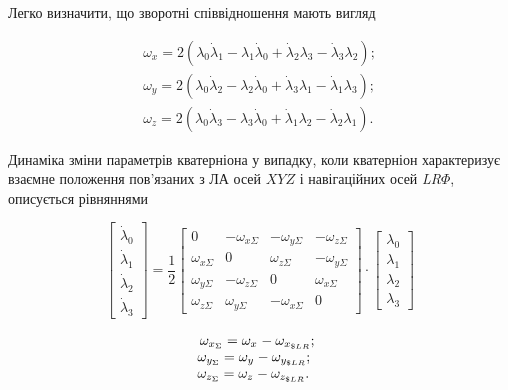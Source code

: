 Легко визначити, що зворотні співвідношення мають вигляд

\[\begin{array}{l} {\omega_{x} =2\left(\lambda_{0} \dot{\lambda }_{1} -\lambda 
_{1} \dot{\lambda }_{0} +\dot{\lambda }_{2} \lambda_{3} -\dot{\lambda }_{3} \lambda 
_{2} \right);} \\ {\omega_{y} =2\left(\lambda_{0} \dot{\lambda }_{2} -\lambda_{2} 
\dot{\lambda }_{0} +\dot{\lambda }_{3} \lambda_{1} -\dot{\lambda }_{1} \lambda_{3} 
\right);} \\ {\omega_{z} =2\left(\lambda_{0} \dot{\lambda }_{3} -\lambda_{3} \dot{
\lambda }_{0} +\dot{\lambda }_{1} \lambda_{2} -\dot{\lambda }_{2} \lambda_{1} \right).} 
\end{array}\] 

Динаміка зміни параметрів кватерніона у випадку, коли кватерніон характеризує взаємне 
положення пов'язаних з ЛА осей $XYZ$ і навігаційних осей \textit{LR$\Phi $}, описується 
рівняннями

\[\left[\begin{array}{c} {\dot{\lambda }_{0} } \\ {\dot{\lambda }_{1} } \\ {\dot{
\lambda }_{2} } \\ {\dot{\lambda }_{3} } \end{array}\right]=\frac{1}{2} \left[\begin{array}{cccc} 
{0} & {-\omega_{x\Sigma } } & {-\omega_{y\Sigma } } & {-\omega_{z\Sigma } } \\ 
{\omega_{x\Sigma } } & {0} & {\omega_{z\Sigma } } & {-\omega_{y\Sigma } } \\ {
\omega_{y\Sigma } } & {-\omega_{z\Sigma } } & {0} & {\omega_{x\Sigma } } \\ {
\omega_{z\Sigma } } & {\omega_{y\Sigma } } & {-\omega_{x\Sigma } } & {0} \end{array}
\right]\cdot \left[\begin{array}{c} {\lambda_{0} } \\ {\lambda_{1} } \\ {\lambda 
_{2} } \\ {\lambda_{3} } \end{array}\right]\] 


\[\begin{array}{l} {\, \omega_{x_{\Sigma } } =\omega_{x_{{\rm }} } -\omega_{x_{
\$ LR} } ;\, \, \, } \\ {\omega_{y_{\Sigma } } =\omega_{y_{{\rm }} } -\omega_{y_{
\$ LR} } ;\, \, \, \, } \\ {\omega_{z_{\Sigma } } =\omega_{z_{{\rm }} } -\omega 
_{z_{\$ LR} } .} \end{array}\] 

